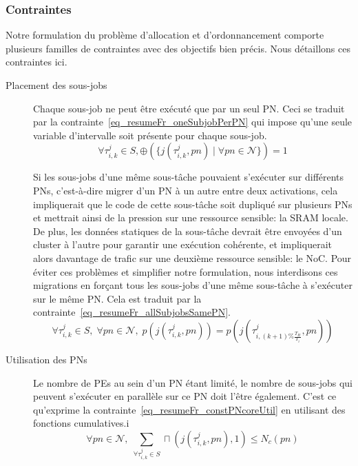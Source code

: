 \documentclass[main.tex]{subfiles}
\begin{document}
\subsubsection{Contraintes}
Notre formulation du problème d'allocation et d'ordonnancement comporte plusieurs familles de contraintes avec des objectifs bien précis. Nous détaillons ces contraintes ici.
\begin{description}
    \item[Placement des sous-jobs]
        Chaque sous-job ne peut être exécuté que par un seul PN. Ceci se traduit par la contrainte~\ref{eq_resumeFr_oneSubjobPerPN} qui impose qu'une seule variable d'intervalle soit présente pour chaque sous-job.
\begin{equation}
    \label{eq_resumeFr_oneSubjobPerPN}
    \forall \tau_{i,k}^j \in S ,  
    \oplus(\{ j( \tau_{i,k}^j , pn ) \; | \; \forall pn \in \mathcal{N}\})=1
\end{equation}

        Si les sous-jobs d'une même sous-tâche pouvaient s'exécuter sur différents PNs, c'est-à-dire migrer d'un PN à un autre entre deux activations, cela impliquerait que le code de cette sous-tâche soit dupliqué sur plusieurs PNs et mettrait ainsi de la pression sur une ressource sensible: la SRAM locale. De plus, les données statiques de la sous-tâche devrait être envoyées d'un cluster à l'autre pour garantir une exécution cohérente, et impliquerait alors davantage de trafic sur une deuxième ressource sensible: le NoC. Pour éviter ces problèmes et simplifier notre formulation, nous interdisons ces migrations en forçant tous les sous-jobs d'une même sous-tâche à s'exécuter sur le même PN. Cela est traduit par la contrainte~\ref{eq_resumeFr_allSubjobsSamePN}.
\begin{equation}
    \label{eq_resumeFr_allSubjobsSamePN}
    \forall \tau_{i,k}^j \in S, \; \forall pn \in \mathcal{N}, \;
    p( j( \tau_{i,k}^j, pn )) = p( j( \tau_{i,(k+1) \% \frac{T_H}{T_i}}^j, pn ))
\end{equation}

    \item[Utilisation des PNs]
        Le nombre de PEs au sein d'un PN étant limité, le nombre de sous-jobs qui peuvent s'exécuter en parallèle sur ce PN doit l'être également. C'est ce qu'exprime la contrainte~\ref{eq_resumeFr_constPNcoreUtil} en utilisant des fonctions cumulatives.i
\begin{equation}
    \label{eq_resumeFr_constPNcoreUtil}
    \forall pn \in \mathcal{N} , \;
    \underset{\forall \tau_{i,k}^j \in S}{\sum} \sqcap( j( \tau_{i,k}^j , pn ),1) \leq N_c(pn)
\end{equation}


\end{description}
\end{document}
